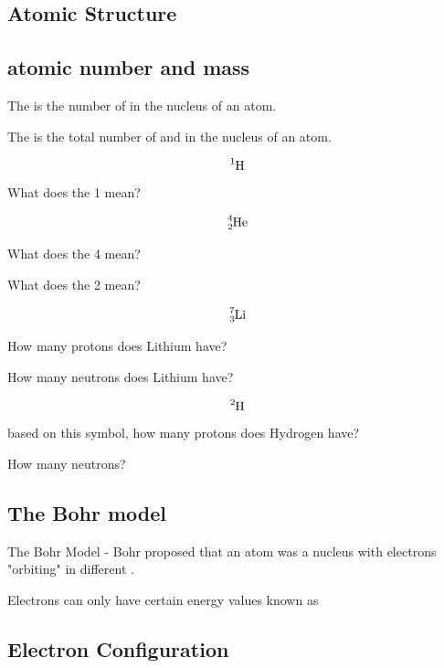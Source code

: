 \documentclass[12pt]{exam}
\begin{document}
\twocolumn
    
\begin{questions}
        
\section{Atomic Structure}

\subsection{atomic number and mass}

\question The  is the number of \fillin[protons][3cm] in the nucleus of an atom.

\question The  is the total number of \fillin[protons][2cm] and \fillin[neutrons][2cm]in the nucleus of an atom.



\question $$\ce{^{1}_{}H}$$
What does the 1 mean?



$$\ce{^{4}_{2}He}$$

\question What does the 4 mean? 


\question What does the 2 mean?

\fillin[\# of neutrons][6cm]

\question $$\ce{^{7}_{3}Li}$$

How many protons does Lithium have? \fillin[3][2cm]

How many neutrons does Lithium have? \fillin[7 - 3 = 4][2cm]

\question $$\ce{^{2}_{}H}$$ based on this symbol, how many protons does Hydrogen have? \fillin[1][1cm]

How many neutrons? \fillin[1][1cm]

\subsection{The Bohr model}

\question   The Bohr Model - Bohr proposed that an atom was a nucleus with electrons "orbiting" in different .

\question Electrons can only have certain energy values known as 

\subsection{Electron Configuration}


\end{questions}
\end{document}
